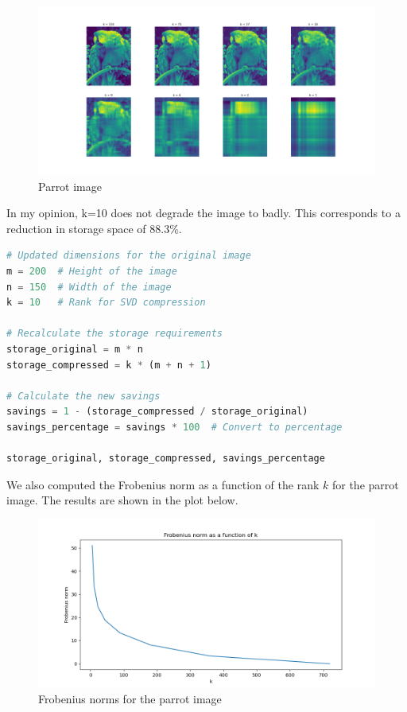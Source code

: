 \documentclass[12pt]{article}
\begin{document}
\begin{figure}
\centering
\includegraphics[width=\textwidth]{reconstructions_parrot.png}
\caption{Parrot image}
\end{figure}
In my opinion, k=10 does not degrade the image to badly. This corresponds to a reduction in storage space of 88.3\%.
\begin{lstlisting}[language=Python]
# Updated dimensions for the original image
m = 200  # Height of the image
n = 150  # Width of the image
k = 10   # Rank for SVD compression

# Recalculate the storage requirements
storage_original = m * n
storage_compressed = k * (m + n + 1)

# Calculate the new savings
savings = 1 - (storage_compressed / storage_original)
savings_percentage = savings * 100  # Convert to percentage

storage_original, storage_compressed, savings_percentage
\end{lstlisting}
We also computed the Frobenius norm as a function of the rank $k$ for the parrot image. The results are shown in the plot below.
\begin{figure}
\centering
\includegraphics[width=\textwidth]{frobenius_norms.png}
\caption{Frobenius norms for the parrot image}
\end{figure}
\end{document}

